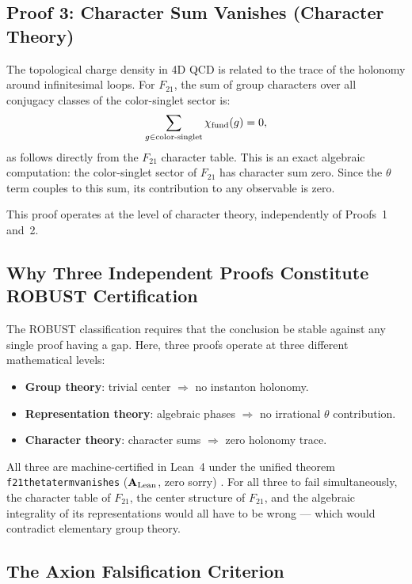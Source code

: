 \documentclass[11pt,openany]{book}
\theoremstyle{remark}
\newcommand{\lean}[1]{%
  \penalty-100
  \begingroup\def\_{\textunderscore\allowbreak}\texttt{#1}\endgroup}
\newcommand{\CatAL}{\ensuremath{\textbf{A}_{\rm Lean}}}
\begin{document}
\subsection*{Proof 3: Character Sum Vanishes (Character Theory)}

The topological charge density in 4D QCD is related to the trace of the holonomy around
infinitesimal loops.  For $F_{21}$, the sum of group characters over all conjugacy classes
of the color-singlet sector is:
\begin{equation}
  \sum_{g \in \text{color-singlet}}
  \chi_{\rm fund}(g) = 0,
  \label{eq:character_sum}
\end{equation}
as follows directly from the $F_{21}$ character table.  This is an exact algebraic
computation: the color-singlet sector of $F_{21}$ has character sum zero.  Since the
$\theta$ term couples to this sum, its contribution to any observable is zero.

This proof operates at the level of character theory, independently of Proofs~1 and~2.

\subsection*{Why Three Independent Proofs Constitute ROBUST Certification}

The ROBUST classification requires that the conclusion be stable against any single proof
having a gap.  Here, three proofs operate at three different mathematical levels:
\begin{itemize}
\item \textbf{Group theory}: trivial center $\Rightarrow$ no instanton holonomy.
\item \textbf{Representation theory}: algebraic phases $\Rightarrow$ no irrational $\theta$
  contribution.
\item \textbf{Character theory}: character sums $\Rightarrow$ zero holonomy trace.
\end{itemize}
All three are machine-certified in Lean~4 under the unified theorem
\lean{f21\_theta\_term\_vanishes} (\CatAL{}, zero sorry) \cite{SpivackGTEQCDStructure}.
For all three to fail simultaneously, the character table of $F_{21}$, the center
structure of $F_{21}$, and the algebraic integrality of its representations would all
have to be wrong --- which would contradict elementary group theory.

\subsection*{The Axion Falsification Criterion}
\end{document}
